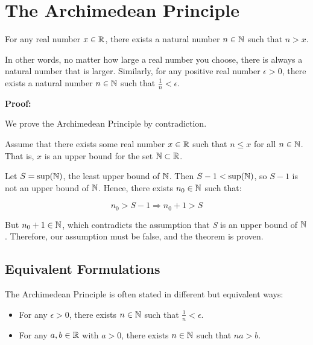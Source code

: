 \newpage
\section{The Archimedean Principle}

For any real number \( x \in \mathbb{R} \), there exists a natural number \( n \in \mathbb{N} \) such 
that \( n > x \).

In other words, no matter how large a real number you choose, there is always a natural number that 
is larger. Similarly, for any positive real number \( \epsilon > 0 \), there exists a natural number 
\( n \in \mathbb{N} \) such that \( \frac{1}{n} < \epsilon \).

\textbf{Proof:}

We prove the Archimedean Principle by contradiction.

Assume that there exists some real number \( x \in \mathbb{R} \) such that \( n \leq x \) for all 
\( n \in \mathbb{N} \). That is, \(x\) is an upper bound for the set \( \mathbb{N} \subset \mathbb{R}\).

Let \( S = \sup(\mathbb{N}) \), the least upper bound of \( \mathbb{N} \). Then 
\( S - 1 < \sup(\mathbb{N}) \), so \( S - 1 \) is not an upper bound of \( \mathbb{N} \). Hence, 
there exists \( n_0 \in \mathbb{N} \) such that:

\[
	n_0 > S - 1 \Rightarrow n_0 + 1 > S
\]

But \( n_0 + 1 \in \mathbb{N} \), which contradicts the assumption that \emph{S} is an upper bound of 
\(\mathbb{N} \). Therefore, our assumption must be false, and the theorem is proven.

\QED

\subsection{Equivalent Formulations}

The Archimedean Principle is often stated in different but equivalent ways:

\begin{itemize}
	
	\item For any \( \epsilon > 0 \), there exists \( n \in \mathbb{N} \) such that \( \frac{1}{n} < 
		  \epsilon \).
	
	\item For any \( a, b \in \mathbb{R} \) with \( a > 0 \), there exists \( n \in \mathbb{N} \) such that 
	      \( na > b \).

\end{itemize}


